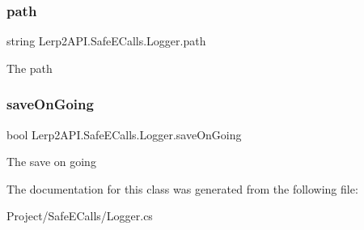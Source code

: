 \subsubsection{\texorpdfstring{path}{path}}
{\footnotesize\ttfamily string Lerp2\+A\+P\+I.\+Safe\+E\+Calls.\+Logger.\+path}



The path 

\mbox{\label{class_lerp2_a_p_i_1_1_safe_e_calls_1_1_logger_afe7d01ca1c989391d718005df4f61a5a}} 
\subsubsection{\texorpdfstring{save\+On\+Going}{saveOnGoing}}
{\footnotesize\ttfamily bool Lerp2\+A\+P\+I.\+Safe\+E\+Calls.\+Logger.\+save\+On\+Going}



The save on going 



The documentation for this class was generated from the following file\+:\begin{DoxyCompactItemize}
\item 
Project/\+Safe\+E\+Calls/Logger.\+cs\end{DoxyCompactItemize}
